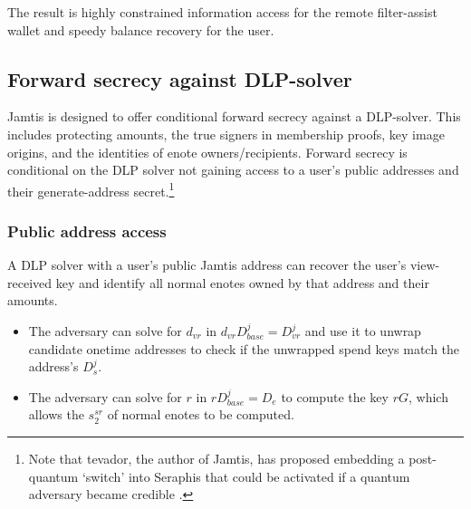 The result is highly constrained information access for the remote filter-assist wallet and speedy balance recovery for the user.


\subsection{Forward secrecy against DLP-solver}
\label{subsec:jamtis-forward-secrecy-dlp-solver}

Jamtis is designed to offer conditional forward secrecy against a DLP-solver. This includes protecting amounts, the true signers in membership proofs, key image origins, and the identities of enote owners/recipients. Forward secrecy is conditional on the DLP solver not gaining access to a user's public addresses and their generate-address secret.\footnote{Note that tevador, the author of Jamtis, has proposed embedding a post-quantum `switch' into Seraphis that could be activated if a quantum adversary became credible \cite{seraphis-post-quantum-switch}.}

\subsubsection{Public address access}
\label{subsubsec:jamtis-forward-secrecy-address-access}

A DLP solver with a user's public Jamtis address can recover the user's view-received key and identify all normal enotes owned by that address and their amounts.
\begin{itemize}
    \item The adversary can solve for $d_{vr}$ in $d_{vr} D^j_{base} = D^j_{vr}$ and use it to unwrap candidate onetime addresses to check if the unwrapped spend keys match the address's $D^j_s$.

    \item The adversary can solve for $r$ in $r D^j_{base} = D_e$ to compute the key $r G$, which allows the $s^{sr}_2$ of normal enotes to be computed.
\end{itemize}

